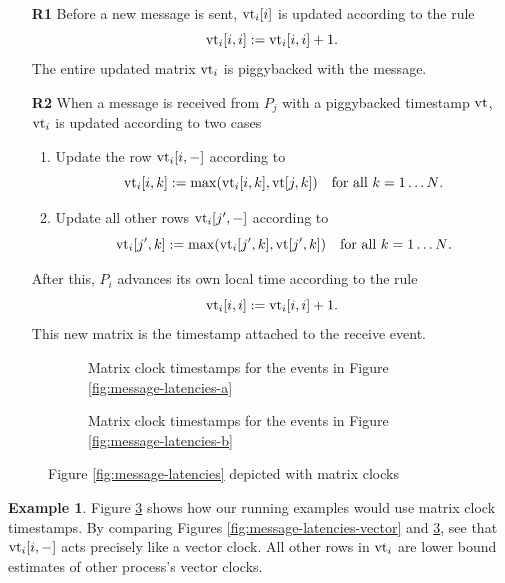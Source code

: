 \documentclass[]             %
{NASA}                       %
\theoremstyle{definition}
\newtheorem{example}{Example}[section]
\begin{document}
\begin{enumerate}
\item[\textbf{R1}] Before a new message is sent, $\textrm{vt}_i[i]$ is updated according to the rule
  \[\textrm{vt}_i[i,i] := \textrm{vt}_i[i,i] + 1.\]
  The entire updated matrix $\textrm{vt}_i$ is piggybacked with the message.
\item[\textbf{R2}] When a message is received from $P_j$ with a piggybacked timestamp $\textrm{vt}$,
  $\textrm{vt}_i$ is updated according to two cases
  \begin{enumerate}
  \item Update the row $\textrm{vt}_i[i, -]$ according to
    \[\textrm{vt}_i[i, k] := \max(\textrm{vt}_i[i,k], \textrm{vt}[j, k]) \quad \textrm{for all $k = 1\ldots N$}.\]
  \item Update all other rows $\textrm{vt}_i[j', -]$ according to
    \[\textrm{vt}_i[j', k] := \max(\textrm{vt}_i[j',k], \textrm{vt}[j', k]) \quad \textrm{for all $k = 1\ldots N$}.\]
  \end{enumerate}
  After this, $P_i$ advances its own local time according to the rule
  \[ \textrm{vt}_i[i,i] := \textrm{vt}_i[i,i] + 1.\]
  This new matrix is the timestamp attached to the receive event.
\end{enumerate}

\begin{figure}[p]
  \begingroup
  \setlength\belowcaptionskip{4ex}
  \begin{subfigure}{1\textwidth}
    \caption{Matrix clock timestamps for the events in Figure \ref{fig:message-latencies-a}}
    \label{fig:message-latencies-matrix-a}
  \end{subfigure}
  \begin{subfigure}{1\textwidth}
    \caption{Matrix clock timestamps for the events in Figure \ref{fig:message-latencies-b}}
    \label{fig:message-latencies-matrix-b}
  \end{subfigure}
  \caption{Figure \ref{fig:message-latencies} depicted with matrix clocks}
  \label{fig:message-latencies-matrix}
  \endgroup
\end{figure}

\begin{example}
  Figure \ref{fig:message-latencies-matrix} shows how our running
  examples would use matrix clock timestamps. By comparing Figures
  \ref{fig:message-latencies-vector} and
  \ref{fig:message-latencies-matrix}, see that $\textrm{vt}_i[i,-]$ acts
  precisely like a vector clock. All other rows in $\textrm{vt}_i$ are lower
  bound estimates of other process's vector clocks.
\end{example}
\end{document}
